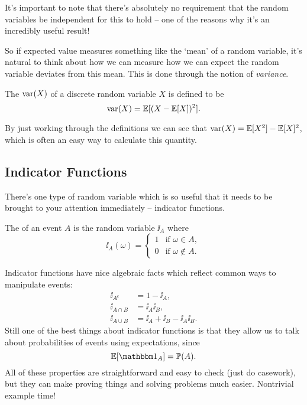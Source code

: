 \documentclass[a4paper]{scrartcl}
\begin{document}
It's important to note that there's absolutely no requirement that the random variables be independent for this to hold -- one of the reasons why it's an incredibly useful result!

So if expected value measures something like the `mean' of a random variable, it's natural to think about how we can measure how we can expect the random variable deviates from this mean. This is done through the notion of \emph{variance}.

\begin{definition}[Variance]
	The  $\operatorname{var}(X)$ of a discrete random variable $X$ is defined to be
	$$
\operatorname{var}(X) = \mathbb{E}[(X - \mathbb{E}[X])^2].
	$$
\end{definition}

By just working through the definitions we can see that $\operatorname{var}(X) = \mathbb{E}[X^2] - \mathbb{E}[X]^2$, which is often an easy way to calculate this quantity.

\subsection{Indicator Functions}

There's one type of random variable which is so useful that it needs to be brought to your attention immediately -- indicator functions.

\begin{definition}
	The  of an event $A$ is the random variable $\ii_A$ where
	$$
\ii_A(\omega) = \begin{cases}
	1 &\mbox{if } \omega  \in A, \\
	0 &\mbox{if } \omega  \not \in A.
   \end{cases}
	$$
\end{definition}

Indicator functions have nice algebraic facts which reflect common ways to manipulate events:
\begin{align*}
	\ii_{A^c} &= 1 - \ii_A, \\
	\ii_{A \cap B} &= \ii_A \ii_B, \\
	\ii_{A \cup B} &= \ii_A + \ii_B - \ii_A \ii_B.
\end{align*}
Still one of the best things about indicator functions is that they allow us to talk about probabilities of events using expectations, since
$$
\EE[\ii_A]= \PP(A).
$$
All of these properties are straightforward and easy to check (just do casework), but they can make proving things and solving problems much easier. Nontrivial example time!
\end{document}
